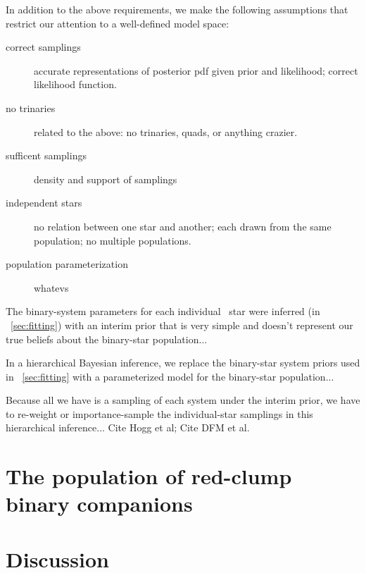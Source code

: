 \documentclass[modern, letterpaper]{aastex61}
\newcommand{\RC}{\acronym{RC}}
\begin{document}
In addition to the above requirements, we make the following assumptions
that restrict our attention to a well-defined model space:
\begin{description}
\item[correct samplings] accurate representations of posterior pdf
  given prior and likelihood; correct likelihood function.
\item[no trinaries] related to the above: no trinaries, quads, or anything
  crazier.
\item[sufficent samplings] density and support of samplings
\item[independent stars] no relation between one star and another; each
  drawn from the same population; no multiple populations.
\item[population parameterization] whatevs
\end{description}

The binary-system parameters for each individual \RC\ star were
inferred (in \sectionname~\ref{sec:fitting}) with an interim prior that
is very simple and doesn't represent our true beliefs about the
binary-star population...

In a hierarchical Bayesian inference, we replace the binary-star
system priors used in \sectionname~\ref{sec:fitting} with a parameterized
model for the binary-star population...

Because all we have is a sampling of each system under the interim prior,
we have to re-weight or importance-sample the individual-star samplings
in this hierarchical inference... Cite Hogg et al; Cite DFM et al.

\section{The population of red-clump binary companions}

\section{Discussion}
\end{document}
